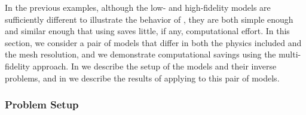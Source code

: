 \documentclass[review,sort&compress]{elsarticle}
\theoremstyle{plain} %
\theoremstyle{definition} %
\begin{document}
In the previous examples, although the low- and high-fidelity models are sufficiently different to illustrate the behavior of , they are both simple enough and similar enough that using  saves little, if any, computational effort. In this section, we consider a pair of models that differ in both the physics included and the mesh resolution, and we demonstrate computational savings using the multi-fidelity approach. In  we describe the setup of the models and their inverse problems, and in  we describe the results of applying  to this pair of models.

\subsubsection{Problem Setup} \label{sec:setup3D_diffmesh}
\end{document}
